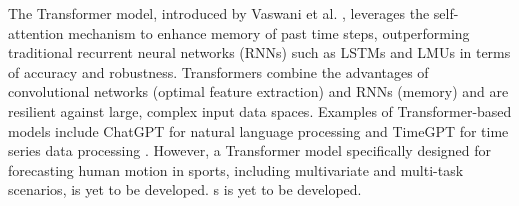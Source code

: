 The Transformer model, introduced by Vaswani et al. \cite{transformer}, leverages the self-attention mechanism to enhance memory of past time steps, outperforming traditional recurrent neural networks (RNNs) such as LSTMs \cite{lstm} and LMUs \cite{lmu} in terms of accuracy and robustness. Transformers combine the advantages of convolutional networks (optimal feature extraction) and RNNs (memory) and are resilient against large, complex input data spaces. Examples of Transformer-based models include ChatGPT for natural language processing \cite{gpt} and TimeGPT for time series data processing \cite{timegpt}. However, a Transformer model specifically designed for forecasting human motion in sports, including multivariate and multi-task scenarios, is yet to be developed.
s is yet to be developed.